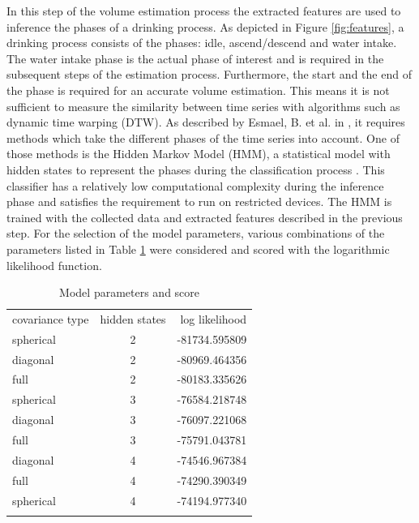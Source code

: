 In this step of the volume estimation process the extracted features are used to inference the phases of a drinking process. As depicted in Figure \ref{fig:features}, a drinking process consists of the phases: idle, ascend/descend and water intake. The water intake phase is the actual phase of interest and is required in the subsequent steps of the estimation process. Furthermore, the start and the end of the phase is required for an accurate volume estimation. This means it is not sufficient to measure the similarity between time series with algorithms such as dynamic time warping (DTW). As described by Esmael, B. et al. in \cite{Bagnall2017}, it requires methods which take the different phases of the time series into account. One of those methods is the Hidden Markov Model (HMM), a statistical model with hidden states to represent the phases during the classification process \cite{6421385}. This classifier has a relatively low computational complexity during the inference phase and satisfies the requirement to run on restricted devices. 
The HMM is trained with the collected data and extracted features described in the previous step. For the selection of the model parameters, various combinations of the parameters listed in Table \ref{tab:score} were considered and scored with the logarithmic likelihood function. 
\begin{table}[h]
    \centering
    \caption{Model parameters and score}
    \begin{tabular}{lcr}
        \hline\noalign{\smallskip}
        covariance type     &   hidden states   & log likelihood \\
        \tableheadseprule\noalign{\smallskip}
        spherical           &   2               & -81734.595809 \\
        diagonal            &   2               & -80969.464356 \\
        full                &   2               & -80183.335626 \\
        spherical           &   3               & -76584.218748 \\
        diagonal            &   3               & -76097.221068 \\
        full                &   3               & -75791.043781 \\
        diagonal            &   4               & -74546.967384 \\
        full                &   4               & -74290.390349 \\
        spherical           &   4               & -74194.977340 \\
        \noalign{\smallskip}\hline
    \end{tabular}
    \label{tab:score}
\end{table}\\
